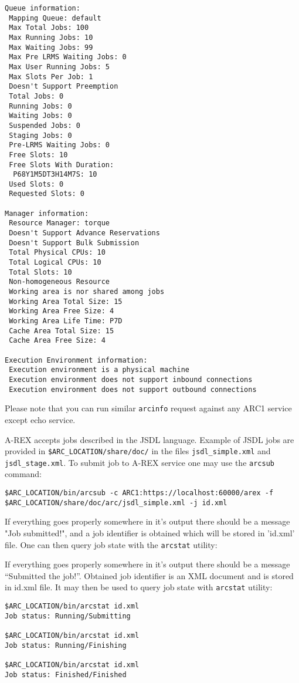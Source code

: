 \documentclass{article}                            %
\begin{document}
\begin{lstlisting}[caption={Example of proper arcinfo output},label=lst:arcinfo]
Queue information:
 Mapping Queue: default
 Max Total Jobs: 100
 Max Running Jobs: 10
 Max Waiting Jobs: 99
 Max Pre LRMS Waiting Jobs: 0
 Max User Running Jobs: 5
 Max Slots Per Job: 1
 Doesn't Support Preemption
 Total Jobs: 0
 Running Jobs: 0
 Waiting Jobs: 0
 Suspended Jobs: 0
 Staging Jobs: 0
 Pre-LRMS Waiting Jobs: 0
 Free Slots: 10
 Free Slots With Duration:
  P68Y1M5DT3H14M7S: 10
 Used Slots: 0
 Requested Slots: 0

Manager information:
 Resource Manager: torque
 Doesn't Support Advance Reservations
 Doesn't Support Bulk Submission
 Total Physical CPUs: 10
 Total Logical CPUs: 10
 Total Slots: 10
 Non-homogeneous Resource
 Working area is nor shared among jobs
 Working Area Total Size: 15
 Working Area Free Size: 4
 Working Area Life Time: P7D
 Cache Area Total Size: 15
 Cache Area Free Size: 4

Execution Environment information:
 Execution environment is a physical machine
 Execution environment does not support inbound connections
 Execution environment does not support outbound connections
\end{lstlisting}

Please note that you can run similar \texttt{arcinfo} request against any ARC1
service except echo service.

A-REX accepts jobs described in the JSDL language. Example of JSDL jobs are
provided in \verb|$ARC_LOCATION/share/doc/| in the files \verb|jsdl_simple.xml|
and \verb|jsdl_stage.xml|. To submit job to A-REX service one may use the
\texttt{arcsub} command:

\begin{lstlisting}
$ARC_LOCATION/bin/arcsub -c ARC1:https://localhost:60000/arex -f $ARC_LOCATION/share/doc/arc/jsdl_simple.xml -j id.xml
\end{lstlisting}

If everything goes properly somewhere in it's output there should be a message
"Job submitted!", and a job identifier is obtained which will be stored
in 'id.xml' file. One can then query job state with the \texttt{arcstat} utility:

If everything goes properly somewhere in it's output there should be a message
``Submitted the job!''. Obtained job identifier is an XML document and is stored
in id.xml file. It may then be used to query job state with \texttt{arcstat}
utility:

\begin{lstlisting}
$ARC_LOCATION/bin/arcstat id.xml
Job status: Running/Submitting

$ARC_LOCATION/bin/arcstat id.xml
Job status: Running/Finishing

$ARC_LOCATION/bin/arcstat id.xml
Job status: Finished/Finished
\end{lstlisting}
\end{document}
